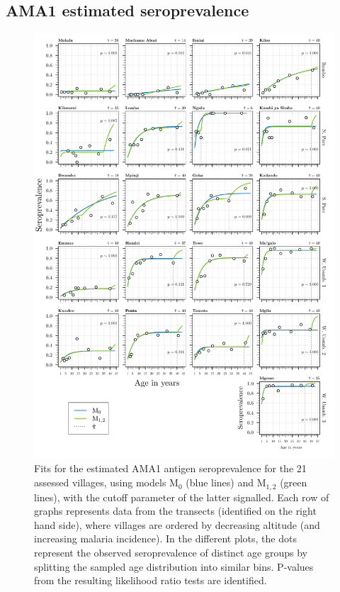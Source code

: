 \begin{appendices}
\subsection{AMA1 estimated seroprevalence} \label{appendix:M2.seroprev.ama1}

\begin{figure}[H]
\center
\begin{adjustbox}{width=\linewidth,totalheight=\baselineskip}
\includegraphics[width=\columnwidth]{images/Seroprevalence_M0vM12_ama1.pdf}
\end{adjustbox}
\caption[Estimated AMA1 seroprevalence for models M$_0$ and M$_{1,2}$]{Fits for the estimated AMA1 antigen seroprevalence for the 21 assessed villages, using models M$_0$ (blue lines) and M$_{1,2}$ (green lines), with the cutoff parameter of the latter signalled. Each row of graphs represents data from the transects (identified on the right hand side), where villages are ordered by decreasing altitude (and increasing malaria incidence). In the different plots, the dots represent the observed seroprevalence of distinct age groups by splitting the sampled age distribution into similar bins. P-values from the resulting likelihood ratio tests are identified.}
\label{fig:ama1.seroprevalence.M0.M12}
\end{figure}


\end{appendices}

